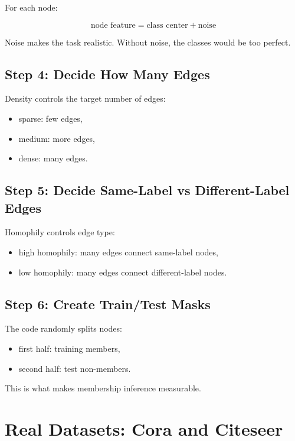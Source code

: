 \documentclass[11pt,a4paper]{article}
\begin{document}
For each node:

\[
\text{node feature} = \text{class center} + \text{noise}
\]

Noise makes the task realistic. Without noise, the classes would be too perfect.

\subsection{Step 4: Decide How Many Edges}

Density controls the target number of edges:

\begin{itemize}
  \item sparse: few edges,
  \item medium: more edges,
  \item dense: many edges.
\end{itemize}

\subsection{Step 5: Decide Same-Label vs Different-Label Edges}

Homophily controls edge type:

\begin{itemize}
  \item high homophily: many edges connect same-label nodes,
  \item low homophily: many edges connect different-label nodes.
\end{itemize}

\subsection{Step 6: Create Train/Test Masks}

The code randomly splits nodes:

\begin{itemize}
  \item first half: training members,
  \item second half: test non-members.
\end{itemize}

This is what makes membership inference measurable.

\section{Real Datasets: Cora and Citeseer}
\end{document}
